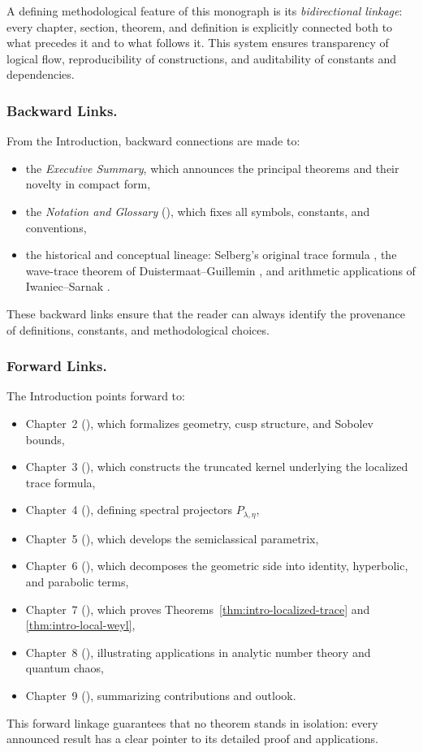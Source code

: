 A defining methodological feature of this monograph is its \emph{bidirectional linkage}:
every chapter, section, theorem, and definition is explicitly connected both to what precedes it
and to what follows it. This system ensures transparency of logical flow,
reproducibility of constructions, and auditability of constants and dependencies.

\subsubsection*{Backward Links.}
From the Introduction, backward connections are made to:
\begin{itemize}
  \item the \emph{Executive Summary}, which announces the principal theorems and their novelty in compact form,
  \item the \emph{Notation and Glossary} (), which fixes all symbols, constants, and conventions,
  \item the historical and conceptual lineage: Selberg’s original trace formula \cite{Selberg1956},
        the wave-trace theorem of Duistermaat–Guillemin \cite{DG1975}, and
        arithmetic applications of Iwaniec–Sarnak \cite{Iwaniec2002}.
\end{itemize}
These backward links ensure that the reader can always identify the provenance of definitions,
constants, and methodological choices.

\subsubsection*{Forward Links.}
The Introduction points forward to:
\begin{itemize}
  \item Chapter~2 (), which formalizes geometry, cusp structure, and Sobolev bounds,
  \item Chapter~3 (), which constructs the truncated kernel underlying the localized trace formula,
  \item Chapter~4 (), defining spectral projectors $P_{\lambda,\eta}$,
  \item Chapter~5 (), which develops the semiclassical parametrix,
  \item Chapter~6 (), which decomposes the geometric side into identity, hyperbolic, and parabolic terms,
  \item Chapter~7 (), which proves Theorems~\ref{thm:intro-localized-trace} and \ref{thm:intro-local-weyl},
  \item Chapter~8 (), illustrating applications in analytic number theory and quantum chaos,
  \item Chapter~9 (), summarizing contributions and outlook.
\end{itemize}
This forward linkage guarantees that no theorem stands in isolation:
every announced result has a clear pointer to its detailed proof and applications.

